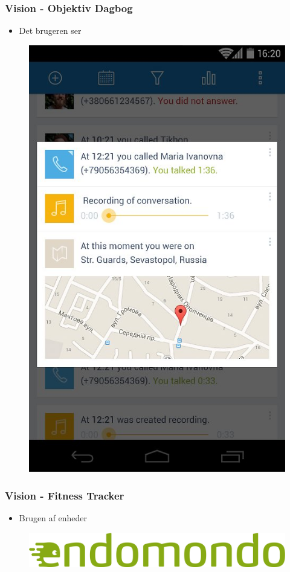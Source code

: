 \begin{frame}
\frametitle{Vision - Objektiv Dagbog}
\begin{itemize}
	\item Det brugeren ser
\end{itemize}
\begin{figure}
	\includegraphics[scale=0.2]{graphics/diary}
\end{figure}
\end{frame}

\begin{frame}
\frametitle{Vision - Fitness Tracker}
\begin{itemize}
	\item Brugen af enheder
\end{itemize}
\begin{figure}
	\includegraphics[scale=0.4]{graphics/fitnesstracker}
\end{figure}
\end{frame}